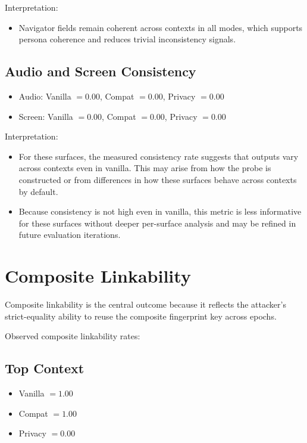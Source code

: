 \documentclass[11pt]{report}
\begin{document}
Interpretation:
\begin{itemize}
    \item Navigator fields remain coherent across contexts in all modes, which supports persona coherence and reduces trivial inconsistency signals.
\end{itemize}

\subsection{Audio and Screen Consistency}

\begin{itemize}
    \item Audio: Vanilla $=0.00$, Compat $=0.00$, Privacy $=0.00$
    \item Screen: Vanilla $=0.00$, Compat $=0.00$, Privacy $=0.00$
\end{itemize}

Interpretation:
\begin{itemize}
    \item For these surfaces, the measured consistency rate suggests that outputs vary across contexts even in vanilla. This may arise from how the probe is constructed or from differences in how these surfaces behave across contexts by default.
    \item Because consistency is not high even in vanilla, this metric is less informative for these surfaces without deeper per-surface analysis and may be refined in future evaluation iterations.
\end{itemize}

\section{Composite Linkability}

Composite linkability is the central outcome because it reflects the attacker’s strict-equality ability to reuse the composite fingerprint key across epochs.

Observed composite linkability rates:

\subsection{Top Context}

\begin{itemize}
    \item Vanilla $=1.00$
    \item Compat $=1.00$
    \item Privacy $=0.00$
\end{itemize}
\end{document}

